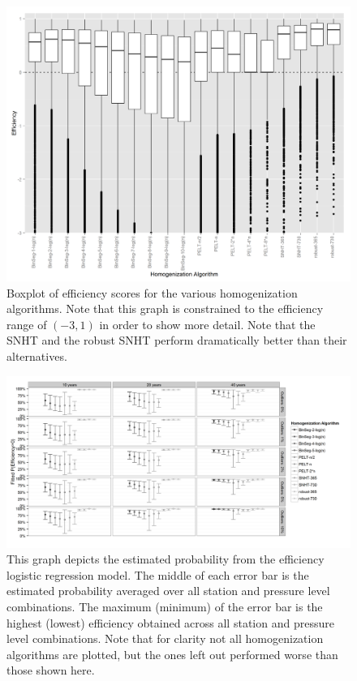 \documentclass[12pt]{article}
\begin{document}
\begin{figure}[h!]
	\centering
	\includegraphics[width=\textwidth]{homogenization_efficiency_boxplots}
	\caption{Boxplot of efficiency scores for the various homogenization algorithms.  Note that this graph is constrained to the efficiency range of $(-3,1)$ in order to show more detail.  Note that the SNHT and the robust SNHT perform dramatically better than their alternatives.}
	\label{fig:homEfficiency}
\end{figure}

\begin{figure}[h!]
	\centering
	\includegraphics[width=\textwidth]{Efficiency_Model_Plot_BW}
	\caption{This graph depicts the estimated probability from the efficiency logistic regression model.  The middle of each error bar is the estimated probability averaged over all station and pressure level combinations.  The maximum (minimum) of the error bar is the highest (lowest) efficiency obtained across all station and pressure level combinations.  Note that for clarity not all homogenization algorithms are plotted, but the ones left out performed worse than those shown here.}
	\label{fig:homFitEff}
\end{figure}
\end{document}
